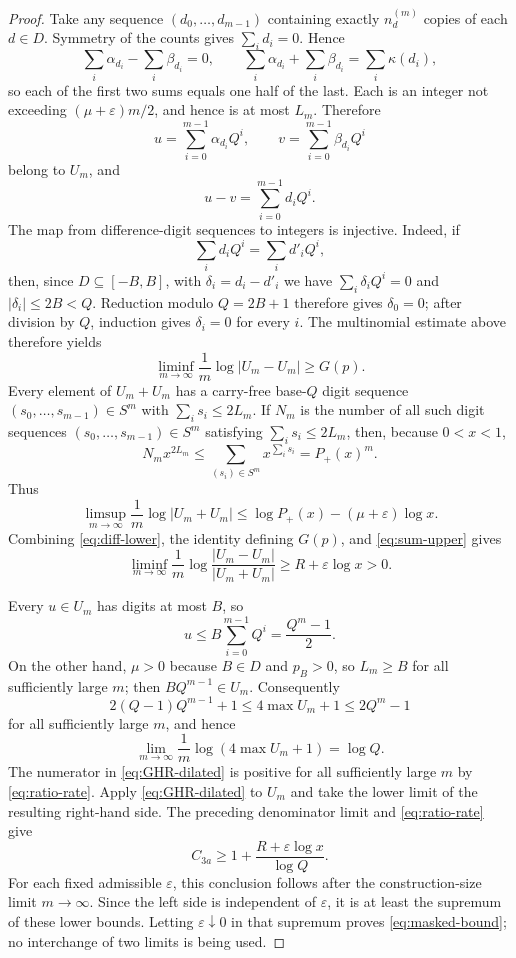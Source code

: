 \documentclass[11pt]{article}
\newcommand{\card}[1]{\lvert #1\rvert}
\begin{document}
\begin{proof}
Take any sequence $(d_0,\ldots,d_{m-1})$ containing exactly
$n_d^{(m)}$ copies of each $d\in D$. Symmetry of the counts gives
$\sum_i d_i=0$. Hence
\[
 \sum_i\alpha_{d_i}-\sum_i\beta_{d_i}=0,
 \qquad
 \sum_i\alpha_{d_i}+\sum_i\beta_{d_i}=\sum_i\kappa(d_i),
\]
so each of the first two sums equals one half of the last. Each is an
integer not exceeding $(\mu+\varepsilon)m/2$, and hence is at most $L_m$.
Therefore
\[
 u=\sum_{i=0}^{m-1}\alpha_{d_i}Q^i,
 \qquad
 v=\sum_{i=0}^{m-1}\beta_{d_i}Q^i
\]
belong to $U_m$, and
\[
 u-v=\sum_{i=0}^{m-1}d_iQ^i.
\]
The map from difference-digit sequences to integers is injective. Indeed, if
\[
 \sum_i d_iQ^i=\sum_i d'_iQ^i,
\]
then, since $D\subseteq[-B,B]$, with $\delta_i=d_i-d'_i$ we have
$\sum_i\delta_iQ^i=0$ and $|\delta_i|\le2B<Q$. Reduction modulo
$Q=2B+1$ therefore gives $\delta_0=0$; after division by $Q$, induction
gives $\delta_i=0$ for every $i$. The multinomial estimate above therefore yields
\begin{equation}\label{eq:diff-lower}
 \liminf_{m\to\infty}\frac1m\log\card{U_m-U_m}\ge G(p).
\end{equation}
Every element of $U_m+U_m$ has a carry-free base-$Q$ digit sequence
$(s_0,\ldots,s_{m-1})\in S^m$ with $\sum_i s_i\le2L_m$. If $N_m$ is the
number of all such digit sequences $(s_0,\ldots,s_{m-1})\in S^m$ satisfying
$\sum_i s_i\le2L_m$, then, because $0<x<1$,
\[
 N_mx^{2L_m}
 \le\sum_{(s_i)\in S^m}x^{\sum_i s_i}
 =P_+(x)^m.
\]
Thus
\begin{equation}\label{eq:sum-upper}
 \limsup_{m\to\infty}\frac1m\log\card{U_m+U_m}
 \le \log P_+(x)-(\mu+\varepsilon)\log x.
\end{equation}
Combining \eqref{eq:diff-lower}, the identity defining $G(p)$, and
\eqref{eq:sum-upper} gives
\begin{equation}\label{eq:ratio-rate}
 \liminf_{m\to\infty}\frac1m
 \log\frac{\card{U_m-U_m}}{\card{U_m+U_m}}
 \ge R+\varepsilon\log x>0.
\end{equation}

Every $u\in U_m$ has digits at most $B$, so
\[
 u\le B\sum_{i=0}^{m-1}Q^i
   =\frac{Q^m-1}{2}.
\]
On the other hand, $\mu>0$ because $B\in D$ and $p_B>0$, so
$L_m\ge B$ for all sufficiently large $m$;
then $BQ^{m-1}\in U_m$.  Consequently
\[
 2(Q-1)Q^{m-1}+1
 \le 4\max U_m+1
 \le 2Q^m-1
\]
for all sufficiently large $m$, and hence
\[
 \lim_{m\to\infty}\frac1m\log(4\max U_m+1)=\log Q.
\]
The numerator in \eqref{eq:GHR-dilated} is positive for all sufficiently
large $m$ by \eqref{eq:ratio-rate}.  Apply \eqref{eq:GHR-dilated} to $U_m$
and take the lower limit of the resulting right-hand side.  The preceding
denominator limit and \eqref{eq:ratio-rate} give
\[
 C_{3a}\ge1+\frac{R+\varepsilon\log x}{\log Q}.
\]
For each fixed admissible $\varepsilon$, this conclusion follows after the
construction-size limit $m\to\infty$.  Since the left side is independent of
$\varepsilon$, it is at least the supremum of these lower bounds.  Letting
$\varepsilon\downarrow0$ in that supremum proves \eqref{eq:masked-bound}; no
interchange of two limits is being used.
\end{proof}
\end{document}
